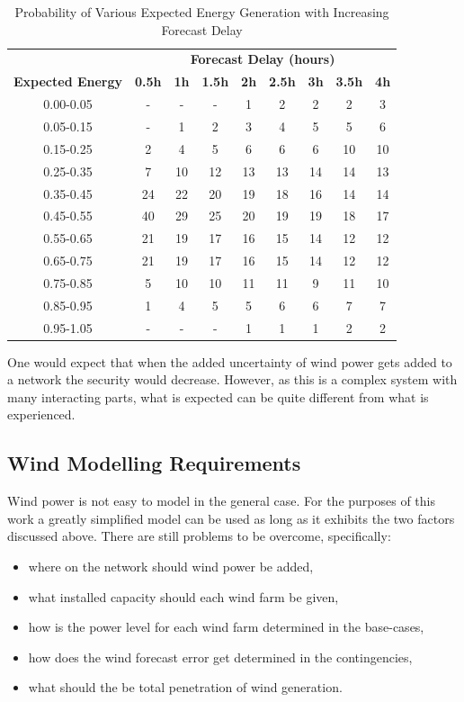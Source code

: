 \documentclass[a4paper,oneside,12pt]{report}
\begin{document}
\begin{table}[htbp]
\caption{Probability of Various Expected Energy Generation with Increasing Forecast Delay \cite{Bathurst2002}}
\label{table_forecast_error}
\centering
\begin{tabular}{c||c|c|c|c|c|c|c|c}
\bfseries  & \multicolumn{8}{c}{ \bfseries Forecast Delay (hours)} \\
\bfseries Expected Energy & \bfseries 0.5h & \bfseries 1h & \bfseries 1.5h & \bfseries 2h & \bfseries 2.5h & \bfseries 3h & \bfseries 3.5h & \bfseries 4h \\
\hline \hline
0.00-0.05 &  - &  - &  - &  1 &  2 &  2 &  2 &  3 \\
0.05-0.15 &  - &  1 &  2 &  3 &  4 &  5 &  5 &  6 \\
0.15-0.25 &  2 &  4 &  5 &  6 &  6 &  6 & 10 & 10 \\
0.25-0.35 &  7 & 10 & 12 & 13 & 13 & 14 & 14 & 13 \\
0.35-0.45 & 24 & 22 & 20 & 19 & 18 & 16 & 14 & 14 \\
0.45-0.55 & 40 & 29 & 25 & 20 & 19 & 19 & 18 & 17 \\
0.55-0.65 & 21 & 19 & 17 & 16 & 15 & 14 & 12 & 12 \\
0.65-0.75 & 21 & 19 & 17 & 16 & 15 & 14 & 12 & 12 \\
0.75-0.85 &  5 & 10 & 10 & 11 & 11 &  9 & 11 & 10 \\
0.85-0.95 &  1 &  4 &  5 &  5 &  6 &  6 &  7 &  7 \\
0.95-1.05 &  - &  - &  - &  1 &  1 &  1 &  2 &  2 \\
\hline
\end{tabular}
\end{table}

One would expect that when the added uncertainty of wind power gets added to a network the security would decrease. However, as this is a complex system with many interacting parts, what is expected can be quite different from what is experienced. 

\subsection{Wind Modelling Requirements}

Wind power is not easy to model in the general case. For the purposes of this work a greatly simplified model can be used as long as it exhibits the two factors discussed above. There are still problems to be overcome, specifically: 

\begin{itemize}
\item where on the network should wind power be added, 
\item what installed capacity should each wind farm be given, 
\item how is the power level for each wind farm determined in the base-cases,
\item how does the wind forecast error get determined in the contingencies,
\item what should the be total penetration of wind generation.
\end{itemize}
\end{document}
